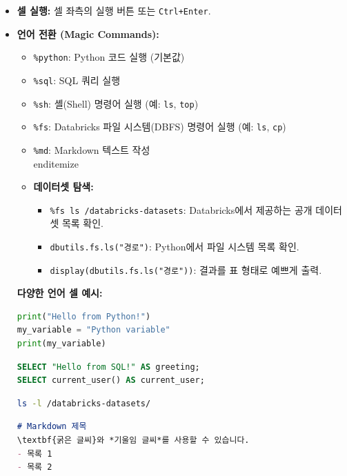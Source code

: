 \documentclass[11pt,a4paper]{article}
\theoremstyle{definition}
\begin{document}
\begin{itemize}
    \item \textbf{셀 실행:} 셀 좌측의 실행 버튼 또는 \texttt{Ctrl+Enter}.
    \item \textbf{언어 전환 (Magic Commands):}
        \begin{itemize}
            \item \texttt{\%python}: Python 코드 실행 (기본값)
            \item \texttt{\%sql}: SQL 쿼리 실행
            \item \texttt{\%sh}: 셸(Shell) 명령어 실행 (예: \texttt{ls}, \texttt{top})
            \item \texttt{\%fs}: Databricks 파일 시스템(DBFS) 명령어 실행 (예: \texttt{ls}, \texttt{cp})
            \item \texttt{\%md}: Markdown 텍스트 작성
        \\end{itemize}
    \item \textbf{데이터셋 탐색:}
        \begin{itemize}
            \item \texttt{\%fs ls /databricks-datasets}: Databricks에서 제공하는 공개 데이터셋 목록 확인.
            \item \texttt{dbutils.fs.ls("경로")}: Python에서 파일 시스템 목록 확인.
            \item \texttt{display(dbutils.fs.ls("경로"))}: 결과를 표 형태로 예쁘게 출력.
        \end{itemize}
\end{itemize}

\begin{examplebox}
\textbf{다양한 언어 셀 예시:}
\begin{lstlisting}[language=python, caption={Python 셀 예시}]
print("Hello from Python!")
my_variable = "Python variable"
print(my_variable)
\end{lstlisting}

\begin{lstlisting}[language=sql, caption={SQL 셀 예시}]
%sql
SELECT "Hello from SQL!" AS greeting;
SELECT current_user() AS current_user;
\end{lstlisting}

\begin{lstlisting}[language=sh, caption={Shell 셀 예시}]
%sh
ls -l /databricks-datasets/
\end{lstlisting}

\begin{lstlisting}[language=markdown, caption={Markdown 셀 예시}]
%md
# Markdown 제목
\textbf{굵은 글씨}와 *기울임 글씨*를 사용할 수 있습니다.
- 목록 1
- 목록 2
\end{lstlisting}
\end{examplebox}


\end{itemize}
\end{document}
